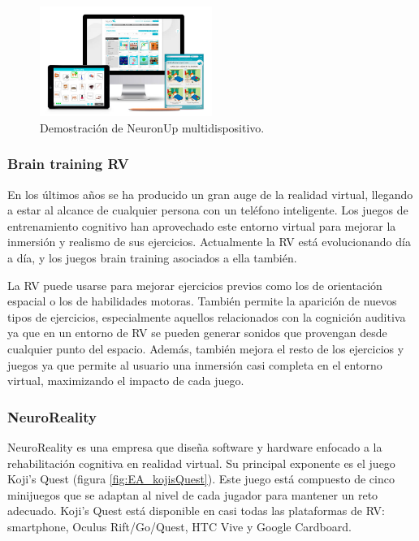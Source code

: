 \begin{figure}
  \centering
\includegraphics[width=0.5\textwidth]{03.EstudioProblema/01.EstadoArte/00.Figuras/06.neuronup.jpg}
    \caption{Demostración de NeuronUp multidispositivo. \cite{EA_img_neuronup}}
    \label{fig:EA_neuronUp}
\end{figure}


\subsubsection{Brain training RV}

En los últimos años se ha producido un gran auge de la realidad virtual, llegando a estar al alcance de cualquier persona con un teléfono inteligente. Los juegos de entrenamiento cognitivo han aprovechado este entorno virtual para mejorar la inmersión y realismo de sus ejercicios. Actualmente la RV está evolucionando día a día, y los juegos brain training asociados a ella también.

La RV puede usarse para mejorar ejercicios previos como los de orientación espacial o los de habilidades motoras. También permite la aparición de nuevos tipos de ejercicios, especialmente aquellos relacionados con la cognición auditiva ya que en un entorno de RV se pueden generar sonidos que provengan desde cualquier punto del espacio. Además, también mejora el resto de los ejercicios y juegos ya que permite al usuario una inmersión casi completa en el entorno virtual, maximizando el impacto de cada juego.


\subsubsection{NeuroReality}

NeuroReality es una empresa que diseña software y hardware enfocado a la rehabilitación cognitiva en realidad virtual. Su principal exponente es el juego Koji’s Quest (figura \ref{fig:EA_kojisQuest}). Este juego está compuesto de cinco minijuegos que se adaptan al nivel de cada jugador para mantener un reto adecuado. Koji’s Quest está disponible en casi todas las plataformas de RV: smartphone, Oculus Rift/Go/Quest, HTC Vive y Google Cardboard. \cite{EA_ent_neuroreality}


